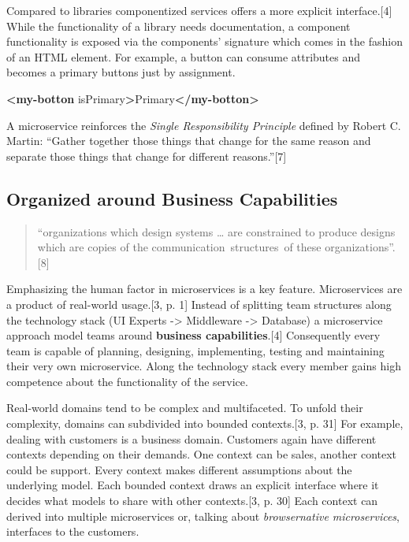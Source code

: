 \documentclass[]{assets/latex/ieee}
\newenvironment{Shaded}{}{}
\newcommand{\KeywordTok}[1]{\textcolor[rgb]{0.00,0.44,0.13}{\textbf{{#1}}}}
\newcommand{\OtherTok}[1]{\textcolor[rgb]{0.00,0.44,0.13}{{#1}}}
\newcommand{\NormalTok}[1]{{#1}}
\begin{document}
Compared to libraries componentized services offers a more explicit
interface.{[}4{]} While the functionality of a library needs
documentation, a component functionality is exposed via the components'
signature which comes in the fashion of an HTML element. For example, a
button can consume attributes and becomes a primary buttons just by
assignment.

\begin{Shaded}
\begin{Highlighting}[]
\KeywordTok{<my-botton}\OtherTok{ isPrimary}\KeywordTok{>}\NormalTok{Primary}\KeywordTok{</my-botton>}
\end{Highlighting}
\end{Shaded}

A microservice reinforces the \emph{Single Responsibility Principle}
defined by Robert C. Martin: ``Gather together those things that change
for the same reason and separate those things that change for different
reasons.''{[}7{]}

\subsection{Organized around Business
Capabilities}\label{organized-around-business-capabilities}

\begin{quote}
``organizations which design systems \ldots{} are constrained to produce
designs which are copies of the communication~structures~of these
organizations''. {[}8{]}
\end{quote}

Emphasizing the human factor in microservices is a key feature.
Microservices are a product of real-world usage.{[}3, p. 1{]} Instead of
splitting team structures along the technology stack (UI Experts
-\textgreater{} Middleware -\textgreater{} Database) a microservice
approach model teams around \textbf{business capabilities}.{[}4{]}
Consequently every team is capable of planning, designing, implementing,
testing and maintaining their very own microservice. Along the
technology stack every member gains high competence about the
functionality of the service.

Real-world domains tend to be complex and multifaceted. To unfold their
complexity, domains can subdivided into bounded contexts.{[}3, p. 31{]}
For example, dealing with customers is a business domain. Customers
again have different contexts depending on their demands. One context
can be sales, another context could be support. Every context makes
different assumptions about the underlying model. Each bounded context
draws an explicit interface where it decides what models to share with
other contexts.{[}3, p. 30{]} Each context can derived into multiple
microservices or, talking about \emph{browsernative microservices},
interfaces to the customers.
\end{document}
